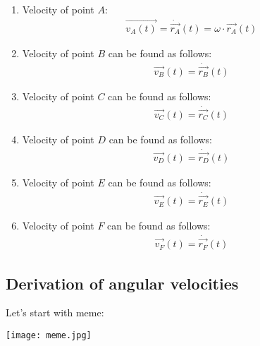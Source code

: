 \begin{answer}

    \begin{enumerate}
        \item Velocity of point $A$:
              \begin{align}
                  \vec{v_A(t)} = \dot{\vec{r_A}}(t) = \omega \cdot \vec{r_A}(t)
              \end{align}

        \item Velocity of point $B$ can be found as follows:
              \begin{align}
                  \vec{v_B}(t) = \dot{\vec{r_B}}(t)
              \end{align}
        \item Velocity of point $C$ can be found as follows:
              \begin{align}
                  \vec{v_C}(t) = \dot{\vec{r_C}}(t)
              \end{align}

        \item Velocity of point $D$ can be found as follows:
              \begin{align}
                  \vec{v_D}(t) = \dot{\vec{r_D}}(t)
              \end{align}

        \item Velocity of point $E$ can be found as follows:
              \begin{align}
                  \vec{v_E}(t) = \dot{\vec{r_E}}(t)
              \end{align}

        \item Velocity of point $F$ can be found as follows:
              \begin{align}
                  \vec{v_F}(t) = \dot{\vec{r_F}}(t)
              \end{align}
    \end{enumerate}
\end{answer}

\subsection{Derivation of angular velocities}

Let's start with meme:

\texttt{[image: meme.jpg]}

